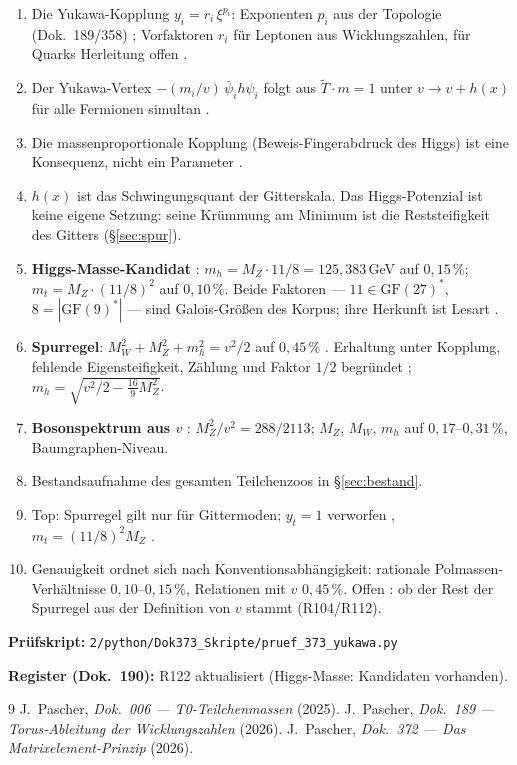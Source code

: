 \begin{enumerate}
\item Die Yukawa-Kopplung $y_i = r_i\,\xi^{p_i}$: Exponenten $p_i$ aus der
  Topologie (Dok.~189/358) \KM; Vorfaktoren $r_i$ für Leptonen aus
  Wicklungszahlen, für Quarks Herleitung offen \SM.
\item Der Yukawa-Vertex $-(m_i/v)\,\bar\psi_i h\psi_i$ folgt aus
  $\tilde T\cdot m = 1$ unter $v\to v+h(x)$ für alle Fermionen
  simultan \BM.
\item Die massenproportionale Kopplung (Beweis-Fingerabdruck des Higgs)
  ist eine Konsequenz, nicht ein Parameter \BM.
\item $h(x)$ ist das Schwingungsquant der Gitterskala. Das Higgs-Potenzial
  ist keine eigene Setzung: seine Krümmung am Minimum ist die
  Reststeifigkeit des Gitters (§\ref{sec:spur}).
\item \textbf{Higgs-Masse-Kandidat} \KM: $m_h = M_Z\cdot11/8 = 125{,}383$\,GeV
  auf $0{,}15\,\%$; $m_t = M_Z\cdot(11/8)^2$ auf $0{,}10\,\%$. Beide
  Faktoren --- $11\in\mathrm{GF}(27)^*$, $8=|\mathrm{GF}(9)^*|$ --- sind
  Galois-Größen des Korpus; ihre Herkunft ist Lesart \SM.
\item \textbf{Spurregel}: $M_W^2+M_Z^2+m_h^2 = v^2/2$ auf $0{,}45\,\%$ \KM.
  Erhaltung unter Kopplung, fehlende Eigensteifigkeit, Zählung und Faktor
  $1/2$ begründet \BM; $m_h = \sqrt{v^2/2-\tfrac{16}{9}M_Z^2}$.
\item \textbf{Bosonspektrum aus $v$} \KM: $M_Z^2/v^2 = 288/2113$;
  $M_Z$, $M_W$, $m_h$ auf $0{,}17$--$0{,}31\,\%$, Baumgraphen-Niveau.
\item Bestandsaufnahme des gesamten Teilchenzoos in §\ref{sec:bestand}.
\item Top: Spurregel gilt nur für Gittermoden; $y_t = 1$ verworfen \XM,
  $m_t = (11/8)^2M_Z$ \KM.
\item Genauigkeit ordnet sich nach Konventionsabhängigkeit: rationale
  Polmassen-Verhältnisse $0{,}10$--$0{,}15\,\%$, Relationen mit $v$
  $0{,}45\,\%$. Offen \SM: ob der Rest der Spurregel aus der Definition von
  $v$ stammt (R104/R112).
\end{enumerate}

\medskip
\noindent\textbf{Prüfskript:} \texttt{2/python/Dok373\_Skripte/pruef\_373\_yukawa.py}

\medskip
\noindent\textbf{Register (Dok.~190):} R122 aktualisiert (Higgs-Masse: Kandidaten vorhanden).

\begin{thebibliography}{9}
 J.~Pascher, \emph{Dok.~006 --- T0-Teilchenmassen} (2025).
 J.~Pascher, \emph{Dok.~189 --- Torus-Ableitung der Wicklungszahlen} (2026).
 J.~Pascher, \emph{Dok.~372 --- Das Matrixelement-Prinzip} (2026).
\end{thebibliography}
